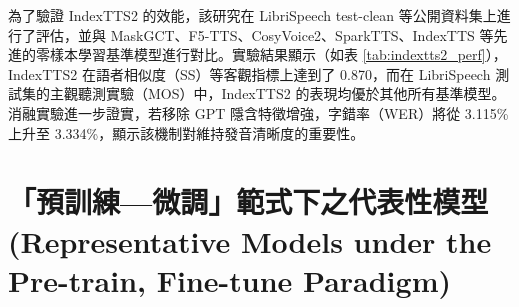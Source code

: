 為了驗證 IndexTTS2 的效能，該研究在 LibriSpeech test-clean 等公開資料集上進行了評估，並與 MaskGCT、F5-TTS、CosyVoice2、SparkTTS、IndexTTS 等先進的零樣本學習基準模型進行對比。實驗結果顯示（如表 \ref{tab:indextts2_perf}），IndexTTS2 在語者相似度（SS）等客觀指標上達到了 0.870，而在 LibriSpeech 測試集的主觀聽測實驗（MOS）中，IndexTTS2 的表現均優於其他所有基準模型。消融實驗進一步證實，若移除 GPT 隱含特徵增強，字錯率（WER）將從 3.115\% 上升至 3.334\%，顯示該機制對維持發音清晰度的重要性。

\begin{table}[H]
\centering
\caption{IndexTTS2 與其他基準模型在 LibriSpeech test-clean 資料集上的效能比較\cite{zhou2025indextts2}}
\label{tab:indextts2_perf}
\end{table}



\section{「預訓練—微調」範式下之代表性模型 (Representative Models under the Pre-train, Fine-tune Paradigm)}

